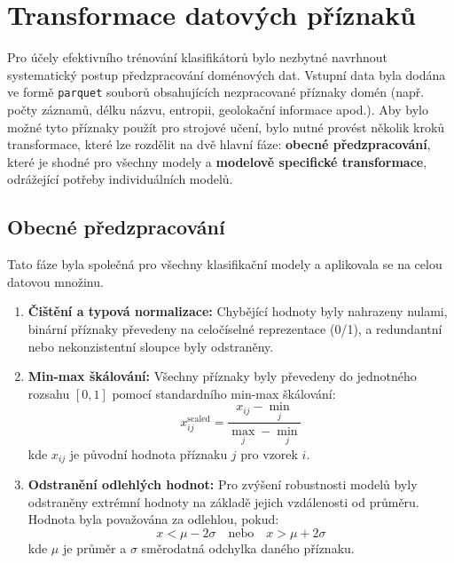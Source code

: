 \section{Transformace datových příznaků}
\label{data-transform}

Pro účely efektivního trénování klasifikátorů bylo nezbytné navrhnout systematický postup předzpracování doménových dat. Vstupní data byla dodána ve formě \texttt{parquet} souborů obsahujících nezpracované příznaky domén (např. počty záznamů, délku názvu, entropii, geolokační informace apod.). Aby bylo možné tyto příznaky použít pro strojové učení, bylo nutné provést několik kroků transformace, které lze rozdělit na dvě hlavní fáze: \textbf{obecné předzpracování}, které je shodné pro všechny modely a \textbf{modelově specifické transformace}, odrážející potřeby individuálních modelů. 

\subsection{Obecné předzpracování}
\label{general_transformation}
Tato fáze byla společná pro všechny klasifikační modely a aplikovala se na celou datovou množinu.

\begin{enumerate}
    \item \textbf{Čištění a typová normalizace:} Chybějící hodnoty byly nahrazeny nulami, binární příznaky převedeny na celočíselné reprezentace (0/1), a redundantní nebo nekonzistentní sloupce byly odstraněny.
    
    \item \textbf{Min-max škálování:} Všechny příznaky byly převedeny do jednotného rozsahu $[0, 1]$ pomocí standardního min-max škálování:
    \begin{equation}
        x_{ij}^{\text{scaled}} = \frac{x_{ij} - \min_j}{\max_j - \min_j}
    \end{equation}
    kde $x_{ij}$ je původní hodnota příznaku $j$ pro vzorek $i$.

    \item \textbf{Odstranění odlehlých hodnot:} Pro zvýšení robustnosti modelů byly odstraněny extrémní hodnoty na základě jejich vzdálenosti od průměru. Hodnota byla považována za odlehlou, pokud:
    \begin{equation}
        x < \mu - 2\sigma \quad \text{nebo} \quad x > \mu + 2\sigma
    \end{equation}
    kde $\mu$ je průměr a $\sigma$ směrodatná odchylka daného příznaku.

\end{enumerate}

